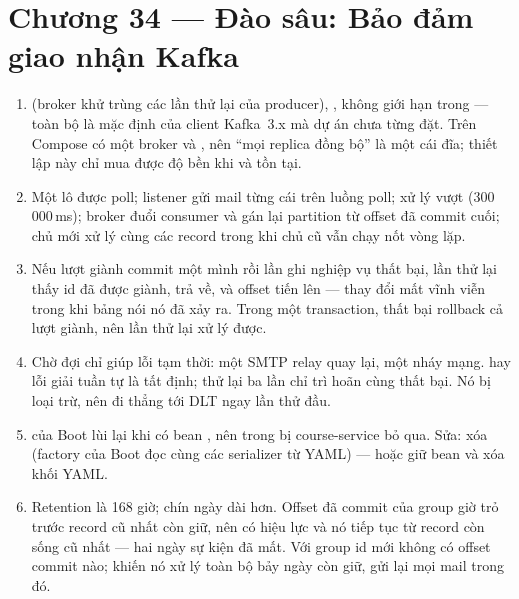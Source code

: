 \section*{Chương 34 --- Đào sâu: Bảo đảm giao nhận Kafka}
\begin{enumerate}
  \item {} (broker khử trùng các lần thử
  lại của producer), ,  không giới hạn
  trong  --- toàn bộ là mặc định của client
  Kafka~3.x mà dự án chưa từng đặt. Trên Compose có một broker và
  , nên ``mọi replica đồng bộ'' là một cái đĩa; thiết
  lập này chỉ mua được độ bền khi  và
   tồn tại.
  \item Một lô được poll; listener gửi mail từng cái trên luồng poll;
  xử lý vượt  (300\,000\,ms); broker đuổi
  consumer và gán lại partition từ offset đã commit cuối; chủ mới xử lý
  cùng các record trong khi chủ cũ vẫn chạy nốt vòng lặp.
  \item Nếu lượt giành commit một mình rồi lần ghi nghiệp vụ thất bại,
  lần thử lại thấy id đã được giành, trả về, và offset tiến lên --- thay
  đổi mất vĩnh viễn trong khi bảng nói nó đã xảy ra. Trong một
  transaction, thất bại rollback cả lượt giành, nên lần thử lại xử lý
  được.
  \item Chờ đợi chỉ giúp lỗi tạm thời: một SMTP relay quay lại, một
  nháy mạng.  hay lỗi giải tuần tự là tất
  định; thử lại ba lần chỉ trì hoãn cùng thất bại. Nó bị loại trừ, nên
  đi thẳng tới DLT ngay lần thử đầu.
  \item {} của Boot lùi lại khi có bean
  , nên  trong
   bị course-service bỏ qua. Sửa: xóa
   (factory của Boot đọc cùng các serializer
  từ YAML) --- hoặc giữ bean và xóa khối YAML.
  \item Retention là 168 giờ; chín ngày dài hơn. Offset đã commit của
  group giờ trỏ trước record cũ nhất còn giữ, nên
   có hiệu lực và nó tiếp tục từ record
  còn sống cũ nhất --- hai ngày sự kiện đã mất. Với group id mới không có
  offset commit nào;  khiến nó xử lý toàn bộ bảy ngày còn
  giữ, gửi lại mọi mail trong đó.
\end{enumerate}

